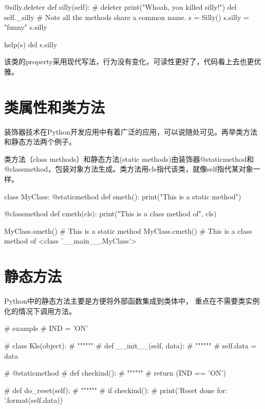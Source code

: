 \begin{python}
\begin{python}
    @silly.deleter
    def silly(self):  # deleter
        print("Whoah, you killed silly!")
        del self._silly
# Note all the methods share a common name.
s = Silly()
s.silly = "funny"
s.silly

help(s)
del s.silly
\end{python}
该类的property采用现代写法，行为没有变化，可读性更好了，代码看上去也更优雅。



\section{类属性和类方法}
装饰器技术在Python开发应用中有着广泛的应用，可以说随处可见。再举类方法和静态方法两个例子。

类方法（class methods）和静态方法(static methods)由装饰器@staticmethod和@classmethod，包装对象方法生成。类方法用cls指代该类，就像self指代某对象一样。
\begin{python}
class MyClass:
    @staticmethod
    def smeth():
        print("This is a static method")

    @classmethod
    def cmeth(cls):
        print("This is a class method of", cls)

MyClass.smeth()
# This is a static method
MyClass.cmeth()
# This is a class method of <class '__main__.MyClass'>
\end{python}
\section{静态方法}
Python中的静态方法主要是方便将外部函数集成到类体中， 重点在不需要类实例化的情况下调用方法。
\begin{python}
# example
# IND = 'ON'

# class Kls(object):
#     """"""
#     def __init__(self, data):
#         """"""
#         self.data = data

#     @staticmethod
#     def checkind():
#         """"""
#         return (IND == 'ON')

#     def do_reset(self):
#         """"""
#         if checkind():
#             print('Reset done for: {}'.format(self.data))


\end{python}
\end{python}
